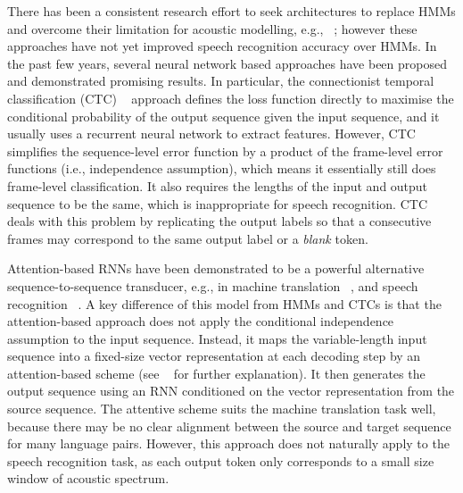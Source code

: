 \documentclass[a4paper]{article}
\begin{document}
There has been a consistent research effort to seek architectures to replace HMMs and overcome their limitation for acoustic modelling, e.g., ~\cite{ostendorf1996,smith2001speech, gunawardana2005hidden, hifny2009speech}; however these approaches have not yet improved speech recognition accuracy over HMMs. In the past few years, several neural network based approaches have been proposed and demonstrated promising results. In particular, the connectionist temporal classification (CTC) ~\cite{graves2014towards, Hannun2014Deep, sak2015fast, miao2015eesen} approach defines the loss function directly to maximise the conditional probability of the output sequence given the input sequence, and it usually uses a recurrent neural network to extract features. However, CTC simplifies the sequence-level error function by a product of the frame-level error functions (i.e., independence assumption), which means it essentially still does frame-level classification. It also requires the lengths of the input and output sequence to be the same, which is inappropriate for speech recognition. CTC deals with this problem by replicating the output labels so that a consecutive frames may correspond to the same output label or a {\it blank} token. 


Attention-based RNNs have been demonstrated to be a powerful alternative sequence-to-sequence transducer, e.g., in machine translation ~\cite{bahdanau2014neural}, and speech recognition ~\cite{chorowski2015attention, lu2015study, chan2015listen}. A key difference of this model from HMMs and CTCs is that the attention-based approach does not apply the conditional independence assumption to the input sequence. Instead, it maps the variable-length input sequence into a fixed-size vector representation at each decoding step by an attention-based scheme (see ~\cite{bahdanau2014neural} for further explanation). It then generates the output sequence using an RNN conditioned on the vector representation from the source sequence. The attentive scheme suits the machine translation task well, because there may be no clear alignment between the source and target sequence for many language pairs. However, this approach does not naturally apply to the speech recognition task, as each output token only corresponds to a small size window of acoustic spectrum. 
\end{document}
